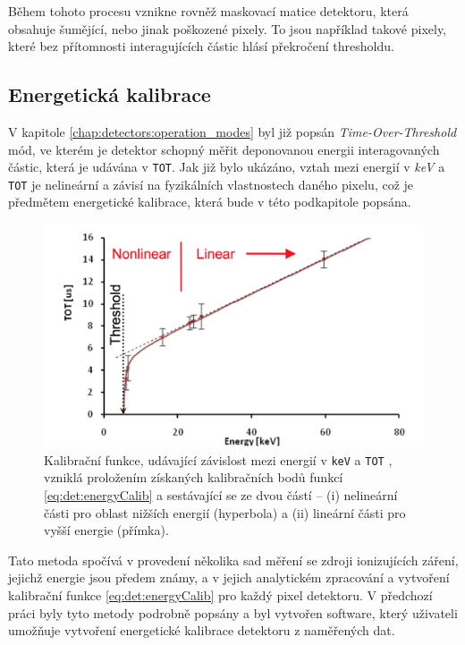 Během tohoto procesu vznikne rovněž maskovací matice detektoru, která obsahuje šumějící, nebo jinak poškozené pixely. To jsou například takové pixely, které bez přítomnosti interagujících částic hlásí překročení thresholdu.

\subsection{Energetická kalibrace}\label{chap:detectors:calibration:energy}
V kapitole \ref{chap:detectors:operation_modes} byl již popsán \textit{Time-Over-Threshold} mód, ve kterém je detektor schopný měřit deponovanou energii interagovaných částic, která je udávána v \texttt{TOT}. Jak již bylo ukázáno, vztah mezi energií v \textit{keV} a \texttt{TOT} je nelineární a závisí na fyzikálních vlastnostech daného pixelu, což je předmětem energetické kalibrace, která bude v této podkapitole popsána.

\begin{figure}[h]
	\begin{center}
		\includegraphics[width=13cm]{figures/calib_function.png}
		\caption{Kalibrační funkce, udávající závislost mezi energií v \texttt{keV} a \texttt{TOT} \cite{Jakubek2011S262}, vzniklá proložením získaných kalibračních bodů funkcí \ref{eq:det:energyCalib} a sestávající se ze dvou částí -- (i) nelineární části pro oblast nižších energií (hyperbola) a (ii) lineární části pro vyšší energie (přímka).}
		\label{fig:det:calib:calib_function}
	\end{center}
\end{figure}

Tato metoda \cite{Jakubek2011S262} spočívá v provedení několika sad měření se zdroji ionizujících záření, jejichž energie jsou předem známy, a v jejich analytickém zpracování a vytvoření kalibrační funkce \ref{eq:det:energyCalib} pro každý pixel detektoru. V předchozí práci \cite{BegeraBcThesis2016} byly tyto metody podrobně popsány a byl vytvořen software, který uživateli umožňuje vytvoření energetické kalibrace detektoru z naměřených dat.


